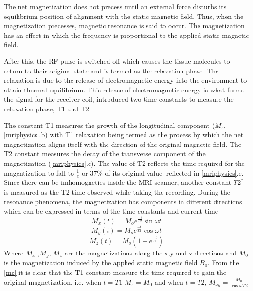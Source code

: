 \documentclass[msthesis.tex]{subfiles}
\begin{document}
The net magnetization does not precess until an external force disturbs its equilibrium position of alignment with the static magnetic field. Thus, when the magnetization precesses, magnetic resonance is said to occur. The magnetization has an effect in which the frequency is proportional to the applied static magnetic field.

After this, the RF pulse is switched off which causes the tissue molecules to return to their original state and is termed as the relaxation phase. The relaxation is due to the release of electromagnetic energy into the environment to attain thermal equilibrium. This release of electromagnetic energy is what forms the signal for the receiver coil, \cite{PhysRev.70.460} introduced two time constants to measure the relaxation phase, T1 and T2.

The constant T1 measures the growth of the longitudinal component ($M_z$, \autoref{mriphysics}.b) with T1 relaxation being termed as the process by which the net magnetization aligns itself with the direction of the original magnetic field. The T2 constant measures the decay of the transverse component of the magnetization (\autoref{mriphysics}.c). The value of T2 reflects the time required for the magentization to fall to $\frac{1}{e}$ or 37\% of its original value, reflected in \autoref{mriphysics}.e. Since there can be imhomogneties inside the \gls{MRI} scanner, another constant $T2^*$ is measured as the T2 time observed while taking the recording.
During the resonance phenomena, the magnetization has components in different directions which can be expressed in terms of the time constants and current time
\begin{equation}
    M_x(t) = M_o e^{\frac{−t}{T2}} \sin{ \omega t}
    \label{mx}
\end{equation}
\begin{equation}
    M_y(t) = M_o e^{\frac{-t}{T2}} \cos{\omega {t}}
    \label{my}
\end{equation}
\begin{equation}
    M_z(t) = M_o (1 − e^{{\frac{−t}{T1}}})
    \label{mz}
\end{equation}
Where $M_x$ ,$M_y$, $M_z$ are the magnetizations along the x,y and z directions and $M_0$ is the magnetization induced by the applied static magnetic field $B_0$. From the \autoref{mz} it is clear that the T1 constant measure the time required to gain the original magnetization, i.e. when $t=T1$
$M_z = M_0$ and when $t=T2$, $M_{xy} = \frac{M_0}{\cos{\omega T2}}$
\end{document}
